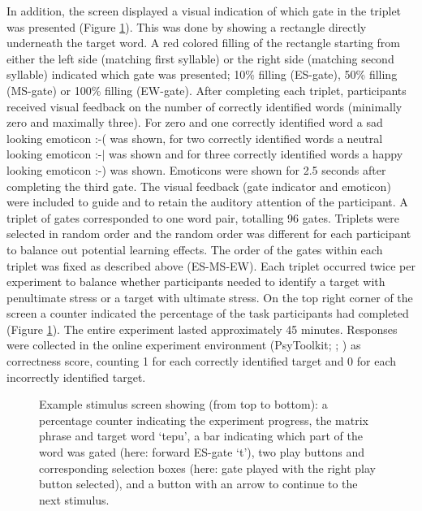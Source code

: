 In addition, the screen displayed a visual indication of which gate in the triplet was presented (Figure \ref{fig503}). This was done by showing a rectangle directly underneath the target word. A red colored filling of the rectangle starting from either the left side (matching first syllable) or the right side (matching second syllable) indicated which gate was presented; 10\% filling (ES-gate), 50\% filling (MS-gate) or 100\% filling (EW-gate). After completing each triplet, participants received visual feedback on the number of correctly identified words (minimally zero and maximally three). For zero and one correctly identified word a sad looking emoticon :-( was shown, for two correctly identified words a neutral looking emoticon :-$\vert$ was shown and for three correctly identified words a happy looking emoticon :-) was shown. Emoticons were shown for 2.5 seconds after completing the third gate. The visual feedback (gate indicator and emoticon) were included to guide and to retain the auditory attention of the participant. A triplet of gates corresponded to one word pair, totalling 96 gates. Triplets were selected in random order and the random order was different for each participant to balance out potential learning effects. The order of the gates within each triplet was fixed as described above (ES-MS-EW). Each triplet occurred twice per experiment to balance whether participants needed to identify a target with penultimate stress or a target with ultimate stress. On the top right corner of the screen a counter indicated the percentage of the task participants had completed (Figure \ref{fig503}). The entire experiment lasted approximately 45 minutes. Responses were collected in the online experiment environment (PsyToolkit; \citealt{stoet_psytoolkit_2010}; \citealt{stoet_psytoolkit_2017}) as correctness score, counting 1 for each correctly identified target and 0 for each incorrectly identified target.\par

\begin{figure}
\fbox{\texttt{[image: 503]}}
\caption{Example stimulus screen showing (from top to bottom): a percentage counter indicating the experiment progress, the matrix phrase and target word `tepu', a bar indicating which part of the word was gated (here: forward ES-gate `t'), two play buttons and corresponding selection boxes (here: gate played with the right play button selected), and a button with an arrow to continue to the next stimulus.}
\label{fig503}
\end{figure}

